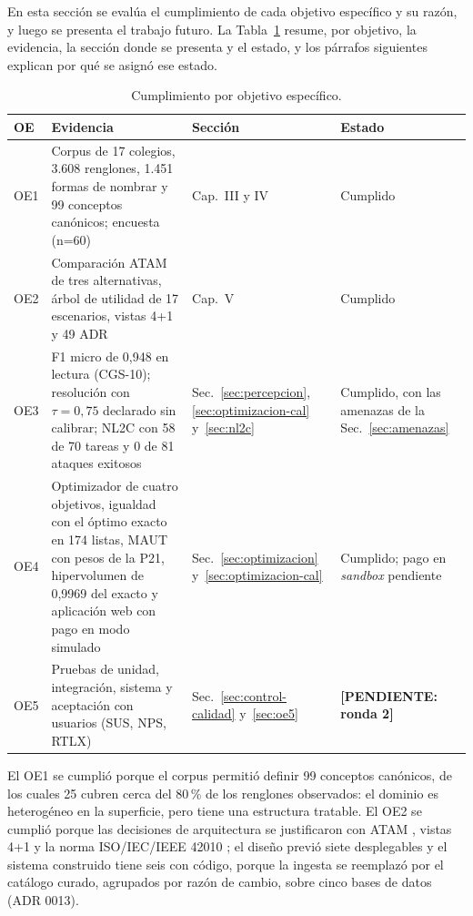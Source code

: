 En esta sección se evalúa el cumplimiento de cada objetivo específico y su razón, y luego se
presenta el trabajo futuro. La Tabla~\ref{tab:cumplimiento} resume, por objetivo, la evidencia, la
sección donde se presenta y el estado, y los párrafos siguientes explican por qué se asignó ese
estado.

\begin{table}[H]
\centering\footnotesize
\setlength{\tabcolsep}{3pt}
\caption{Cumplimiento por objetivo específico.}
\label{tab:cumplimiento}
\begin{tabularx}{\textwidth}{@{}p{0.9cm}Xp{2.9cm}p{2.3cm}@{}}
\toprule
OE & Evidencia & Sección & Estado \\
\midrule
OE1 & Corpus de 17 colegios, 3.608 renglones, 1.451 formas de nombrar y 99 conceptos canónicos; encuesta (n=60) & Cap.~III y IV & Cumplido \\
OE2 & Comparación ATAM de tres alternativas, árbol de utilidad de 17 escenarios, vistas 4+1 y 49 ADR & Cap.~V & Cumplido \\
OE3 & F1 micro de 0,948 en lectura (CGS-10); resolución con $\tau=0{,}75$ declarado sin calibrar; NL2C con 58 de 70 tareas y 0 de 81 ataques exitosos & Sec.~\ref{sec:percepcion}, \ref{sec:optimizacion-cal} y~\ref{sec:nl2c} & Cumplido, con las amenazas de la Sec.~\ref{sec:amenazas} \\
OE4 & Optimizador de cuatro objetivos, igualdad con el óptimo exacto en 174 listas, MAUT con pesos de la P21, hipervolumen de 0,9969 del exacto y aplicación web con pago en modo simulado & Sec.~\ref{sec:optimizacion} y~\ref{sec:optimizacion-cal} & Cumplido; pago en \emph{sandbox} pendiente \\
OE5 & Pruebas de unidad, integración, sistema y aceptación con usuarios (SUS, NPS, RTLX) & Sec.~\ref{sec:control-calidad} y~\ref{sec:oe5} & \textbf{[PENDIENTE: ronda 2]} \\
\bottomrule
\end{tabularx}
\end{table}

El OE1 se cumplió porque el corpus permitió definir 99 conceptos canónicos, de los cuales 25
cubren cerca del 80\,\% de los renglones observados: el dominio es heterogéneo en la superficie,
pero tiene una estructura tratable. El OE2 se cumplió porque las decisiones de arquitectura se
justificaron con ATAM \citep{bass_software_2021}, vistas 4+1 \citep{kruchten_41_1995} y la norma
ISO/IEC/IEEE 42010 \citep{iso_42010_2022}; el diseño previó siete desplegables y el sistema
construido tiene seis con código, porque la ingesta se reemplazó por el catálogo curado, agrupados por razón de cambio, sobre cinco bases de datos (ADR 0013).

